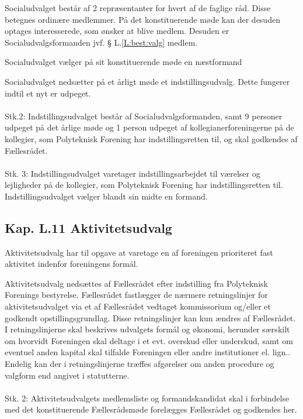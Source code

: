 \begin{list}
\item Socialudvalget består af 2 repræsentanter for hvert af de faglige råd. Disse betegnes ordinære medlemmer. På det konstituerende møde kan der desuden optages interesserede, som ønsker at blive medlem. Desuden er Socialudvalgsformanden jvf. § L.\ref{L:best:valg} medlem.

\item Socialudvalget vælger på sit konstituerende møde en næstformand

\item Socialudvalget nedsætter på et årligt møde et indstillingsudvalg. Dette fungerer indtil et nyt er udpeget.
\\
\\
Stk.2: Indstillingsudvalget består af Socialudvalgsformanden, samt 9 personer udpeget på det årlige møde og 1 person udpeget af kollegianerforeningerne på de kollegier, som Polyteknisk Forening har indstillingsretten til, og skal godkendes af Fællesrådet.
\\
\\
Stk. 3: Indstillingsudvalget varetager indstillingsarbejdet til værelser og lejligheder på de kollegier, som Polyteknisk Forening har indstillingsretten til. Indstillingsudvalget vælger blandt sin midte en formand.




\subsection{Kap. L.11 Aktivitetsudvalg}
\item Aktivitetsudvalg har til opgave at varetage en af foreningen prioriteret fast aktivitet indenfor foreningens formål.

\item Aktivitetsudvalg nedsættes af Fællesrådet efter indstilling fra Polyteknisk Forenings bestyrelse. Fællesrådet fastlægger de nærmere retningslinjer for aktivitetsudvalget via et af Fællesrådet vedtaget kommissorium og/eller et godkendt opstillingsgrundlag. Disse retningslinjer kan kun ændres af Fællesrådet. I retningslinjerne skal beskrives udvalgets formål og økonomi, herunder særskilt om hvorvidt Foreningen skal deltage i et evt. overskud eller underskud, samt om eventuel anden kapital skal tilfalde Foreningen eller andre institutioner el. lign.. Endelig kan der i retningslinjerne træffes afgørelser om anden procedure og valgform end angivet i statutterne.
\\
\\
Stk. 2: Aktivitetsudvalgets medlemsliste og formandskandidat skal i forbindelse med det konstituerende Fællesrådsmøde forelægges Fællesrådet og godkendes her.


\end{list}

